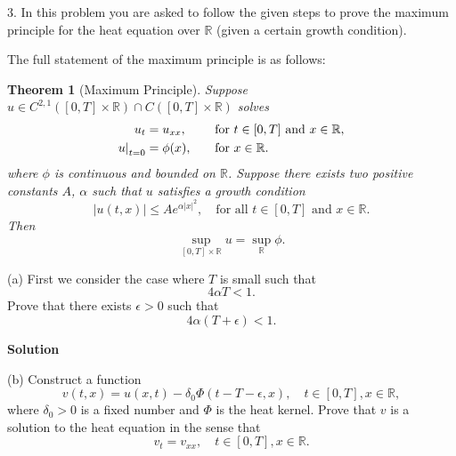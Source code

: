 \documentclass{article}
\newtheorem{theorem}{Theorem}
\begin{document}
\newpage

3. In this problem you are asked to follow the given steps to prove the
maximum principle for the heat equation over $\mathbb{R}$ (given a
certain growth condition).

The full statement of the maximum principle is as follows:
%
\begin{theorem}[Maximum Principle]
    Suppose
    $u \in C^{2, 1} ([0, T] \times \mathbb{R}) \cap C([0, T] \times \mathbb{R})$
    solves
    \begin{alignat*}{2}
        u_t &= u_{xx}, &&\quad\text{for } t \in [0, T] \text{ and } x \in \mathbb{R}, \\
        \eval[0]{u}_{t = 0} &= \phi(x), &&\quad\text{for } x \in \mathbb{R}.
    \end{alignat*}
    where $\phi$ is continuous and bounded on $\mathbb{R}$. Suppose
    there exists two positive constants $A$, $\alpha$ such that $u$
    satisfies a growth condition
    \begin{equation*}
        |u(t, x)| \leq A e^{\alpha |x|^2},
        \quad \text{for all } t \in [0, T] \text{ and } x \in \mathbb{R}
        .
    \end{equation*}
    Then
    \begin{equation}
        \sup_{[0, T] \times \mathbb{R}} u = \sup_{\mathbb{R}} \phi
        .
        \label{eq:2-1}
    \end{equation}
\end{theorem}
%
(a) First we consider the case where $T$ is small such that
%
\begin{equation}
    4 \alpha T < 1
    .
    \label{eq:2-2}
\end{equation}
%
Prove that there exists $\epsilon > 0$ such that
%
\begin{equation*}
    4 \alpha (T + \epsilon) < 1
    .
\end{equation*}

\textbf{Solution}

\vspace{5mm}

(b) Construct a function
%
\begin{equation*}
    v(t, x) = u(x, t) - \delta_0 \Phi(t - T - \epsilon, x),
    \quad t \in [0, T], x \in \mathbb{R}
    ,
\end{equation*}
%
where $\delta_0 > 0$ is a fixed number and $\Phi$ is the heat kernel.
Prove that $v$ is a solution to the heat equation in the sense that
%
\begin{equation*}
    v_t = v_{xx},
    \quad t \in [0, T], x \in \mathbb{R}
    .
\end{equation*}
\end{document}
